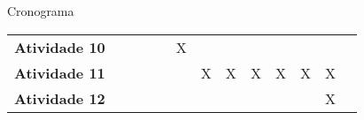 \begin{frame}{Cronograma }
\begin{minipage}[b]{0.9\linewidth}
\begin{table}[h!]
\begin{center}
\begin{small}
\begin{tabular}{p{5cm}cccccccccccc}
  \textbf{Atividade 10}          &             &             &             &             &      X      &             &             &             &             &             &             \\
  \textbf{Atividade 11}    &             &             &             &             &             &      X      &      X      &      X      &      X      &      X      &      X      \\
  \textbf{Atividade 12}     &             &             &             &             &             &             &             &             &             &             &      X      \\
  \bottomrule
\end{tabular}
\end{small}
\end{center}
\end{table}
\end{minipage}
\end{frame}
